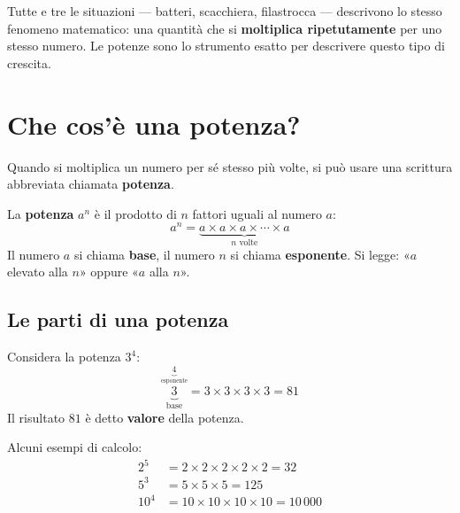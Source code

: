 \begin{attenzione}
  Tutte e tre le situazioni — batteri, scacchiera, filastrocca — descrivono lo stesso
  fenomeno matematico: una quantità che si \textbf{moltiplica ripetutamente} per uno
  stesso numero. Le potenze sono lo strumento esatto per descrivere questo tipo di crescita.
\end{attenzione}

\section{Che cos'è una potenza?}

Quando si moltiplica un numero per sé stesso più volte, si può usare una scrittura
abbreviata chiamata \textbf{potenza}.

\begin{definizione}
  La \textbf{potenza} $a^n$ è il prodotto di $n$ fattori uguali al numero $a$:
  \[
    a^n = \underbrace{a \times a \times a \times \cdots \times a}_{n \text{ volte}}
  \]
  Il numero $a$ si chiama \textbf{base}, il numero $n$ si chiama \textbf{esponente}.
  Si legge: «$a$ elevato alla $n$» oppure «$a$ alla $n$».
\end{definizione}

\subsection{Le parti di una potenza}

\begin{esempio}
  Considera la potenza $3^4$:
  \[
    \underbrace{3}_{\text{base}}^{\!\!\!\underbrace{4}_{\text{esponente}}}
    = 3 \times 3 \times 3 \times 3 = 81
  \]
  Il risultato $81$ è detto \textbf{valore} della potenza.
\end{esempio}

\begin{esempio}
  Alcuni esempi di calcolo:
  \begin{align*}
    2^5  & = 2 \times 2 \times 2 \times 2 \times 2 = 32 \\
    5^3  & = 5 \times 5 \times 5 = 125                  \\
    10^4 & = 10 \times 10 \times 10 \times 10 = 10\,000
  \end{align*}
\end{esempio}


